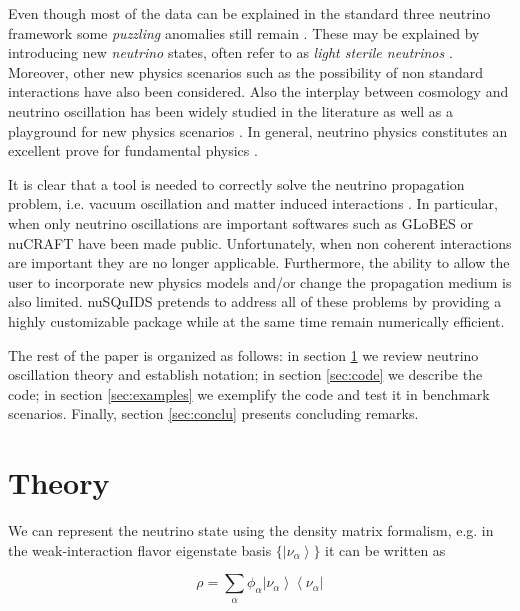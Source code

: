 \documentclass[3p,12pt,authoryear]{elsarticle}
\newcommand{\bra}[1]{\ensuremath{\left\langle#1\right|}}
\newcommand{\ket}[1]{\ensuremath{\left|#1\right\rangle}}
\newcommand{\ttf}{\ttfamily}
\begin{document}
Even though most of the data can be explained in the standard three neutrino framework some {\it puzzling} anomalies still remain \citep{LSND,Mention:2011rr,MiniBoone:2012dn}. These may be explained by introducing new {\it neutrino} states, often refer to as {\it light sterile neutrinos} \citep{kopp2013sterile,Conrad:2013oq,Abazajian:2012rf}. Moreover, other new physics scenarios such as the possibility of non standard interactions \citep{Kopp:2014nosterile,Pospelov:2011dp} have also been considered. Also the interplay between cosmology and neutrino oscillation has been widely studied in the literature as well as a playground for new physics scenarios \citep{Archidiacono:2014oq,Dasgupta:2013la,Saviano:2014bs}. In general, neutrino physics constitutes an excellent prove for fundamental physics \citep{Hewett:2012et}.

It is clear that a tool is needed to correctly solve the neutrino propagation problem, i.e. vacuum oscillation and matter induced interactions \citep{Blennow:2013hi}. In particular, when only neutrino oscillations are important  softwares such as {\ttf GLoBES} \citep{Huber:2007ji} or {\ttf nuCRAFT} \citep{Wallraff:2014vl} have been made public. Unfortunately, when non coherent interactions are important they are no longer applicable. Furthermore, the ability to allow the user to incorporate new physics models and/or change the propagation medium is also limited. {\ttf nuSQuIDS} pretends to address all of these problems by providing a highly customizable package while at the same time remain numerically efficient.

The rest of the paper is organized as follows: in section \ref{sec:theory} we review neutrino oscillation theory and establish notation; in section \ref{sec:code} we describe the code; in section \ref{sec:examples} we exemplify the code and test it in benchmark scenarios. Finally, section \ref{sec:conclu} presents concluding remarks.

\section{Theory}
\label{sec:theory} 
\let\thefootnote\relax{} 

We can represent the neutrino state using the density matrix formalism, e.g. in the weak-interaction flavor eigenstate basis $\{\ket{\nu_\alpha}\}$  it can be written as

\begin{equation}
\rho = \sum_\alpha \phi_\alpha \ket{\nu_\alpha}\bra{\nu_\alpha} 
\label{eq:state}
\end{equation}
\end{document}
